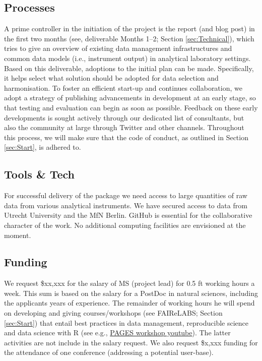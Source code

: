 \documentclass[]{article}
\begin{document}
\hypertarget{processes}{%
\subsection{Processes}\label{processes}}

A prime controller in the initiation of the project is the report (and blog post) in the first two months (see, deliverable Months 1--2; Section \ref{sec:Technical}), which tries to give an overview of existing data management infrastructures and common data models (i.e., instrument output) in analytical laboratory settings. Based on this deliverable, adoptions to the initial plan can be made. Specifically, it helps select what solution should be adopted for data selection and harmonisation. To foster an efficient start-up and continues collaboration, we adopt a strategy of publishing advancements in development at an early stage, so that testing and evaluation can begin as soon as possible. Feedback on these early developments is sought actively through our dedicated list of consultants, but also the community at large through Twitter and other channels. Throughout this process, we will make sure that the code of conduct, as outlined in Section \ref{sec:Start}, is adhered to.

\hypertarget{tools-tech}{%
\subsection{Tools \& Tech}\label{tools-tech}}

For successful delivery of the package we need access to large quantities of raw data from various analytical instruments. We have secured access to data from Utrecht University and the MfN Berlin. GitHub is essential for the collaborative character of the work. No additional computing facilities are envisioned at the moment.

\hypertarget{funding}{%
\subsection{Funding}\label{funding}}

We request \$xx,xxx for the salary of MS (project lead) for 0.5 ft working hours a week. This sum is based on the salary for a PostDoc in natural sciences, including the applicants years of experience. The remainder of working hours he will spend on developing and giving courses/workshops (see FAIReLABS; Section \ref{sec:Start}) that entail best practices in data management, reproducible science and data science with R (see e.g., \href{https://www.youtube.com/watch?v=r99jsChi4HU}{PAGES workshop youtube}). The latter activities are not include in the salary request. We also request \$x,xxx funding for the attendance of one conference (addressing a potential user-base).
\end{document}
